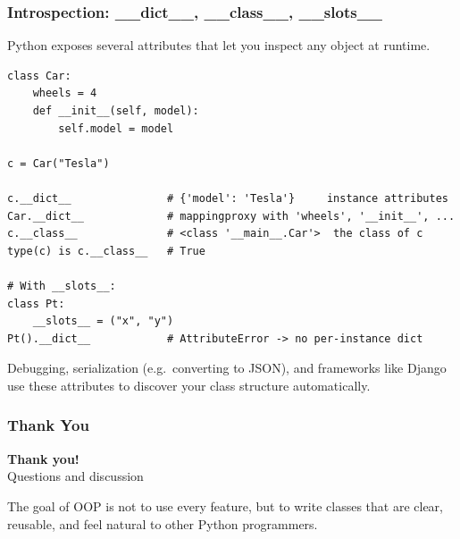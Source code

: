 \documentclass[aspectratio=169,10pt]{beamer}
\begin{document}
\begin{frame}[fragile]
\frametitle{Introspection: \_\_dict\_\_, \_\_class\_\_, \_\_slots\_\_}
\small
Python exposes several attributes that let you inspect any object at runtime.

\vspace{0.15cm}
\begin{lstlisting}[style=pycode]
class Car:
    wheels = 4
    def __init__(self, model):
        self.model = model

c = Car("Tesla")

c.__dict__               # {'model': 'Tesla'}     instance attributes
Car.__dict__             # mappingproxy with 'wheels', '__init__', ...
c.__class__              # <class '__main__.Car'>  the class of c
type(c) is c.__class__   # True

# With __slots__:
class Pt:
    __slots__ = ("x", "y")
Pt().__dict__            # AttributeError -> no per-instance dict
\end{lstlisting}

\begin{tcolorbox}[lecturebox,title=Why introspection helps]
Debugging, serialization (e.g.\ converting to JSON), and frameworks like Django use these attributes to discover your class structure automatically.
\end{tcolorbox}
\end{frame}


\begin{frame}
\frametitle{Thank You}
\vspace{1.75cm}
\begin{center}
{\fontsize{34}{40}\selectfont \textbf{Thank you!}}\\[0.45cm]
{\fontsize{18}{22}\selectfont Questions and discussion}
\end{center}
\vspace{0.80cm}
\begin{tcolorbox}[lecturebox,title=Course takeaway]
The goal of OOP is not to use every feature, but to write classes that are clear, reusable, and feel natural to other Python programmers.
\end{tcolorbox}
\end{frame}
\end{document}
